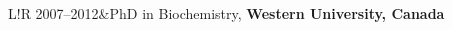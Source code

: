 \documentclass[11pt]{article}
\newcommand\VRule{\color{lightgray}\vrule width 0.5pt}
\begin{document}
{{{{{\begin{tabular}{L!{\VRule}R}
	2007--2012&{PhD in Biochemistry, }{\bf Western University, Canada}\\
\end{tabular}





}}}}}
\end{document}
